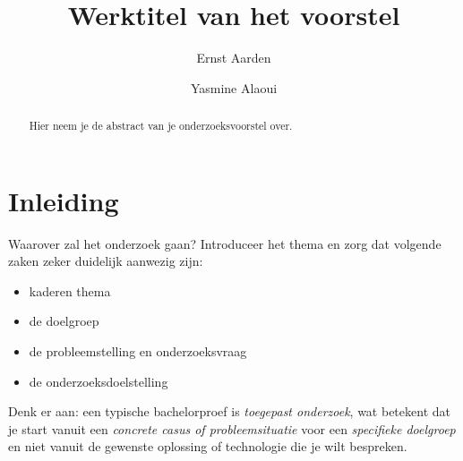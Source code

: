 \documentclass{hogent-article}
\title{Werktitel van het voorstel}
\author{Ernst Aarden}
\author{Yasmine Alaoui}
\begin{document}
\begin{abstract}
  Hier neem je de abstract van je onderzoeksvoorstel over.
\end{abstract}

\tableofcontents

\bigskip

%
%
%

% 
%
%
%

\section{Inleiding}%
\label{sec:inleiding}


Waarover zal het onderzoek gaan? Introduceer het thema en zorg dat volgende zaken zeker duidelijk aanwezig zijn:

\begin{itemize}
  \item kaderen thema
  \item de doelgroep
  \item de probleemstelling en onderzoeksvraag
  \item de onderzoeksdoelstelling
\end{itemize}

Denk er aan: een typische bachelorproef is \emph{toegepast onderzoek}, wat betekent dat je start vanuit een \emph{concrete casus of probleemsituatie} voor een \emph{specifieke doelgroep} en niet vanuit de gewenste oplossing of technologie die je wilt bespreken.
\end{document}
